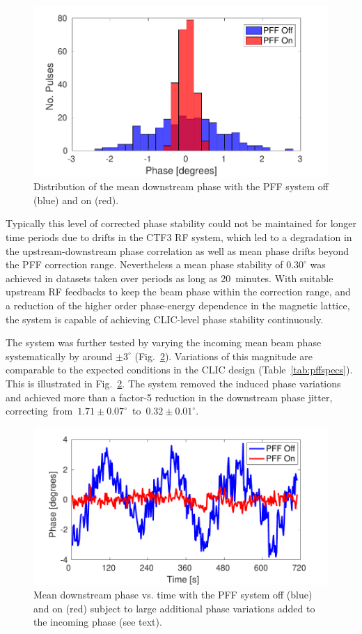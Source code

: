 \documentclass[%
 reprint,
 superscriptaddress,
 amsmath,
 amssymb,
 prl,
]{revtex4-1}
\begin{document}
\begin{figure}
	\includegraphics[width=\columnwidth]{fig8}
	\caption{\label{fig:meanJit}Distribution of the mean downstream phase with 
		the 
		PFF system off (blue) and on (red).}
\end{figure}

Typically this level of corrected phase stability could not be maintained for 
longer time periods due to drifts in the CTF3 RF system, which 
led to  a degradation in the upstream-downstream phase correlation as well as 
mean phase drifts beyond the PFF correction range. Nevertheless a mean phase 
stability of \(0.30^\circ\) was achieved in datasets taken over periods as long 
as 20~minutes. With suitable upstream RF feedbacks to keep the beam phase 
within the correction range, and a reduction of the higher order phase-energy 
dependence in the magnetic lattice, the system is capable of achieving 
CLIC-level phase stability continuously.

The system was further tested by varying the incoming mean 
beam phase systematically by around \(\pm 3^\circ\) (Fig.~\ref{fig:wiggle}). 
Variations of this magnitude 
are comparable to the expected conditions in the CLIC design 
(Table~\ref{tab:pffspecs}). This is illustrated in Fig.~\ref{fig:wiggle}. The 
system removed the induced phase variations and achieved more than a factor-5 
reduction in the downstream phase jitter, 
correcting~from~\(1.71\pm0.07^\circ\)~to~\(0.32\pm0.01^\circ\). 

\begin{figure}
	\includegraphics[width=\columnwidth]{fig9}
	\caption{\label{fig:wiggle}Mean downstream phase vs. time with the PFF 
	system off (blue) and on (red) subject to large additional phase variations 
	added to the incoming phase (see text).}
\end{figure}
\end{document}
